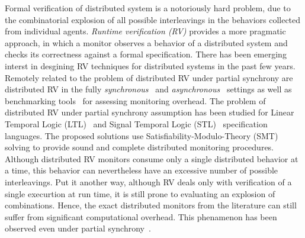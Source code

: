 Formal verification of distributed system is a notoriously hard problem, due to the combinatorial 
explosion of all possible interleavings in the behaviors collected from individual agents.
%
 \emph{Runtime verification (RV)} provides a more pragmatic approach, in which a monitor observes 
 a behavior of a distributed system and checks its correctness against a formal specification.
There has been emerging interst in desgining RV techniques for distributed systems in the past few 
years.
%
Remotely related to the problem of distributed RV under partial synchrony are distributed RV in the 
fully {\em synchronous}~\cite{ef20,cf16,bf16} and {\em 
asynchronous}~\cite{cgnm13,mg05,og07,mb15,g20,bfrrt22} settings as well as  benchmarking 
tools~\cite{aafi21} for assessing monitoring overhead.
%
The problem of distributed RV under partial synchrony assumption has been studied for Linear 
 Temporal Logic (LTL)~\cite{GangulyMB20} and Signal Temporal Logic (STL)~\cite{MomtazAB23} 
 specification languages.
 The proposed solutions use Satisfiability-Modulo-Theory (SMT) solving to provide sound and 
 complete distributed monitoring procedures.
 Although distributed RV monitors consume only a single distributed behavior at a time, this behavior 
 can nevertheless have an excessive number of possible interleavings. 
 Put it another way, although RV deals only with verification of a single execurtion at run time, it is 
 still prone to evaluating an explosion of combinations.
 Hence, the exact distributed monitors from the literature can still suffer from significant 
 computational overhead.
 This phenamenon has been observed even under partial synchrony~\cite{GangulyMB20,gmb24}.
  

